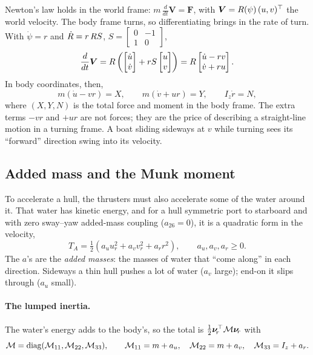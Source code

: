 Newton's law holds in the world frame: $m\,\tfrac{d}{dt}\bm V = \bm F$, with
$\bm V = R(\psi)\,(u, v)^\top$ the world velocity. The body frame turns, so
differentiating brings in the rate of turn. With $\dot\psi = r$ and
$\dot {R} = r\,R S$, $S = \left[\begin{smallmatrix}0&-1\\1&0\end{smallmatrix}\right]$,
\[
  \frac{d}{dt}\bm V = R\left(\begin{bmatrix}\dot u\\ \dot v\end{bmatrix}
                     + r S \begin{bmatrix}u\\ v\end{bmatrix}\right)
                  = R\begin{bmatrix}\dot u - r v\\ \dot v + r u\end{bmatrix}.
\]
In body coordinates, then,
\begin{equation}
  m(\dot u - v r) = X,\qquad m(\dot v + u r) = Y,\qquad I_z \dot r = N,
  \label{eq:s2r-rigid}
\end{equation}
where $(X, Y, N)$ is the total force and moment in the body frame. The extra
terms $-vr$ and $+ur$ are not forces; they are the price of describing a
straight-line motion in a turning frame. A boat sliding sideways at $v$ while
turning sees its ``forward'' direction swing into its velocity.

\subsection{Added mass and the Munk moment}

To accelerate a hull, the thrusters must also accelerate some of the water
around it. That water has kinetic energy, and for a hull symmetric port to
starboard and with zero sway--yaw added-mass coupling ($a_{26}=0$), it is a quadratic form in the velocity,
\[
  T_A = \tfrac12\left(a_u u_r^2 + a_v v_r^2 + a_r r^2\right),\qquad a_u, a_v, a_r \ge 0 .
\]
The $a$'s are the \emph{added masses}: the masses of water that ``come along''
in each direction. Sideways a thin hull pushes a lot of water ($a_v$ large);
end-on it slips through ($a_u$ small).

\paragraph{The lumped inertia.} The water's energy adds to the body's, so the
total is $\tfrac12\bm{\nu}_{\!r}^\top\mathcal{M}\bm{\nu}_{\!r}$ with
\[
  \mathcal{M} = \operatorname{diag}(\mathcal{M}_{11}, \mathcal{M}_{22}, \mathcal{M}_{33}),\qquad
  \mathcal{M}_{11} = m + a_u,\quad \mathcal{M}_{22} = m + a_v,\quad \mathcal{M}_{33} = I_z + a_r .
\]

